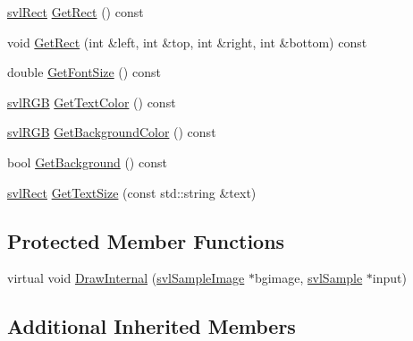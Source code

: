 \begin{DoxyCompactItemize}
\item 
\hyperlink{structsvl_rect}{svl\-Rect} \hyperlink{classsvl_overlay_static_text_a67aa31e47cd5bbc9851cc9e9bffa94b9}{Get\-Rect} () const 
\item 
void \hyperlink{classsvl_overlay_static_text_a50a58dac081cfb45a2175b606ff6ca06}{Get\-Rect} (int \&left, int \&top, int \&right, int \&bottom) const 
\item 
double \hyperlink{classsvl_overlay_static_text_ad9eafddb8965da5f8868fd39cfee4453}{Get\-Font\-Size} () const 
\item 
\hyperlink{structsvl_r_g_b}{svl\-R\-G\-B} \hyperlink{classsvl_overlay_static_text_a1d5badf4b9cf0566c29171e7dd61d0f4}{Get\-Text\-Color} () const 
\item 
\hyperlink{structsvl_r_g_b}{svl\-R\-G\-B} \hyperlink{classsvl_overlay_static_text_a20c0b4378d8036fafaba97b59aa7da7d}{Get\-Background\-Color} () const 
\item 
bool \hyperlink{classsvl_overlay_static_text_add5d739f2993eaa400c7fdbef067ce7b}{Get\-Background} () const 
\item 
\hyperlink{structsvl_rect}{svl\-Rect} \hyperlink{classsvl_overlay_static_text_a9a17b385584564646675d69526a40617}{Get\-Text\-Size} (const std\-::string \&text)
\end{DoxyCompactItemize}
\subsection*{Protected Member Functions}
\begin{DoxyCompactItemize}
\item 
virtual void \hyperlink{classsvl_overlay_static_text_aaa85a4335f542db5815d5dac71c7dc8b}{Draw\-Internal} (\hyperlink{classsvl_sample_image}{svl\-Sample\-Image} $\ast$bgimage, \hyperlink{classsvl_sample}{svl\-Sample} $\ast$input)
\end{DoxyCompactItemize}
\subsection*{Additional Inherited Members}


